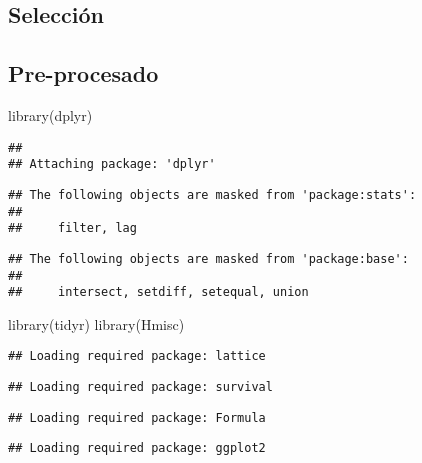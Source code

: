 \documentclass[
]{article}
\newenvironment{Shaded}{\begin{snugshade}}{\end{snugshade}}
\newcommand{\FunctionTok}[1]{\textcolor[rgb]{0.00,0.00,0.00}{#1}}
\newcommand{\NormalTok}[1]{#1}
\begin{document}
\hypertarget{selecciuxf3n}{%
\subsection{Selección}\label{selecciuxf3n}}

\hypertarget{pre-procesado}{%
\subsection{Pre-procesado}\label{pre-procesado}}

\begin{Shaded}
\begin{Highlighting}[]
\FunctionTok{library}\NormalTok{(dplyr)}
\end{Highlighting}
\end{Shaded}

\begin{verbatim}
## 
## Attaching package: 'dplyr'
\end{verbatim}

\begin{verbatim}
## The following objects are masked from 'package:stats':
## 
##     filter, lag
\end{verbatim}

\begin{verbatim}
## The following objects are masked from 'package:base':
## 
##     intersect, setdiff, setequal, union
\end{verbatim}

\begin{Shaded}
\begin{Highlighting}[]
\FunctionTok{library}\NormalTok{(tidyr)}
\FunctionTok{library}\NormalTok{(Hmisc)}
\end{Highlighting}
\end{Shaded}

\begin{verbatim}
## Loading required package: lattice
\end{verbatim}

\begin{verbatim}
## Loading required package: survival
\end{verbatim}

\begin{verbatim}
## Loading required package: Formula
\end{verbatim}

\begin{verbatim}
## Loading required package: ggplot2
\end{verbatim}
\end{document}
